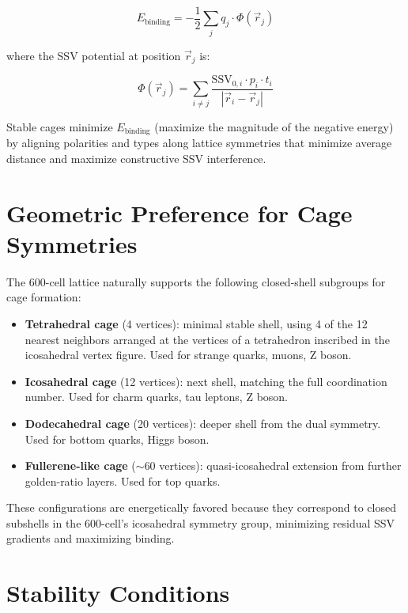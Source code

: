 \documentclass[11pt]{article}
\begin{document}
\begin{equation}
E_{\text{binding}} = -\frac{1}{2} \sum_{j} q_j \cdot \Phi(\vec{r}_j)
\label{eq:binding_energy}
\end{equation}

where the SSV potential at position $\vec{r}_j$ is:

\begin{equation}
\Phi(\vec{r}_j) = \sum_{i \neq j} \frac{\text{SSV}_{0,i} \cdot p_i \cdot t_i}{|\vec{r}_i - \vec{r}_j|}
\label{eq:ssv_potential}
\end{equation}

Stable cages minimize $E_{\text{binding}}$ (maximize the magnitude of the negative energy) by aligning polarities and types along lattice symmetries that minimize average distance and maximize constructive SSV interference.

\section{Geometric Preference for Cage Symmetries}

The 600-cell lattice naturally supports the following closed-shell subgroups for cage formation:

\begin{itemize}
    \item \textbf{Tetrahedral cage} (4 vertices): minimal stable shell, using 4 of the 12 nearest neighbors arranged at the vertices of a tetrahedron inscribed in the icosahedral vertex figure. Used for strange quarks, muons, Z boson.
    \item \textbf{Icosahedral cage} (12 vertices): next shell, matching the full coordination number. Used for charm quarks, tau leptons, Z boson.
    \item \textbf{Dodecahedral cage} (20 vertices): deeper shell from the dual symmetry. Used for bottom quarks, Higgs boson.
    \item \textbf{Fullerene-like cage} ($\sim$60 vertices): quasi-icosahedral extension from further golden-ratio layers. Used for top quarks.
\end{itemize}

These configurations are energetically favored because they correspond to closed subshells in the 600-cell’s icosahedral symmetry group, minimizing residual SSV gradients and maximizing binding.

\section{Stability Conditions}
\end{document}
